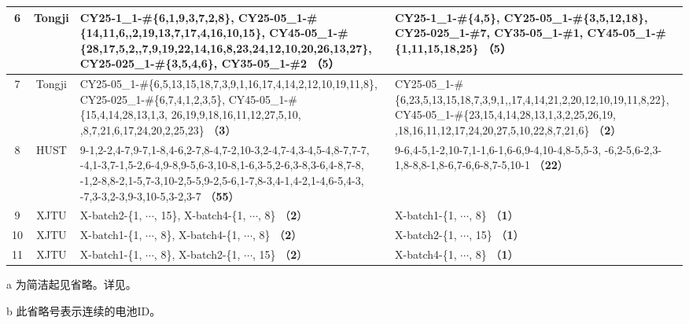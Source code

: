 \documentclass[UTF8,lettersize,journal]{IEEEtran}
\begin{document}
\begin{table}[htbp]
\begin{threeparttable}
\begin{tabularx}{\textwidth}{ccXX}
        \midrule
        6     & Tongji & CY25-1\_1-\#\{6,1,9,3,7,2,8\}, CY25-05\_1-\#\{14,11,6,\newline 1,2,19,13,7,17,4,16,10,15\},  CY45-05\_1-\#\{28,17,5,2,\newline 21,7,9,19,22,14,16,8,23,24,12,10,20,26,13,27\}, \newline CY25-025\_1-\#\{3,5,4,6\}, CY35-05\_1-\#2 （\textbf{5}） & CY25-1\_1-\#\{4,5\}, CY25-05\_1-\#\{3,5,12,18\}, \newline CY25-025\_1-\#7, CY35-05\_1-\#1, \newline CY45-05\_1-\#\{1,11,15,18,25\} （\textbf{5}） \\
        \midrule
        7     & Tongji & CY25-05\_1-\#\{6,5,13,15,18,7,3,9,1,16,17,4,14,2,12,10,19,11,8\}, \newline CY25-025\_1-\#\{6,7,4,1,2,3,5\}, \newline CY45-05\_1-\#\{15,4,14,28,13,1,3, 26,19,9,18,16,11,12,27,5,10, \newline 22,8,7,21,6,17,24,20,2,25,23\} （\textbf{3}） & CY25-05\_1-\#\{6,23,5,13,15,18,7,3,9,1,\newline 16,17,4,14,21,2,20,12,10,19,11,8,22\}, \newline CY45-05\_1-\#\{23,15,4,14,28,13,1,3,2,25,26,19, \newline 9,18,16,11,12,17,24,20,27,5,10,22,8,7,21,6\} （\textbf{2}） \\
        \midrule
        8     & HUST  & 9-1,2-2,4-7,9-7,1-8,4-6,2-7,8-4,7-2,10-3,2-4,7-4,3-4,5-4,8-7,7-7, \newline 4-4,1-3,7-1,5-2,6-4,9-8,9-5,6-3,10-8,1-6,3-5,2-6,3-8,3-6,4-8,7-8, \newline 5-1,2-8,8-2,1-5,7-3,10-2,5-5,9-2,5-6,1-7,8-3,4-1,4-2,1-4,6-5,4-3, \newline 5-7,3-3,2-3,9-3,10-5,3-2,3-7 （\textbf{55}） & 9-6,4-5,1-2,10-7,1-1,6-1,6-6,9-4,10-4,8-5,5-3, \newline 10-6,2-5,6-2,3-1,8-8,8-1,8-6,7-6,6-8,7-5,10-1 （\textbf{22}） \\
        \midrule
        9     & XJTU  & X-batch2-\{1, $\cdots$\tnote{b}, 15\}, X-batch4-\{1, $\cdots$, 8\} （\textbf{2}） & X-batch1-\{1, $\cdots$, 8\} （\textbf{1}） \\
        \midrule
        10    & XJTU  & X-batch1-\{1, $\cdots$, 8\}, X-batch4-\{1, $\cdots$, 8\} （\textbf{2}） & X-batch2-\{1, $\cdots$, 15\} （\textbf{1}） \\
        \midrule
        11    & XJTU  & X-batch1-\{1, $\cdots$, 8\}, X-batch2-\{1, $\cdots$, 15\} （\textbf{2}） & X-batch4-\{1, $\cdots$, 8\} （\textbf{1}） \\
        \bottomrule
        \end{tabularx}%
        \begin{tablenotes}
          \item[a] 为简洁起见省略。详见\cite{TAN2024103725}。
          \item[b] 此省略号表示连续的电池ID。
      \end{tablenotes}
      \end{threeparttable}
      \label{tab:tasks}%
      \end{table}%
\end{document}
